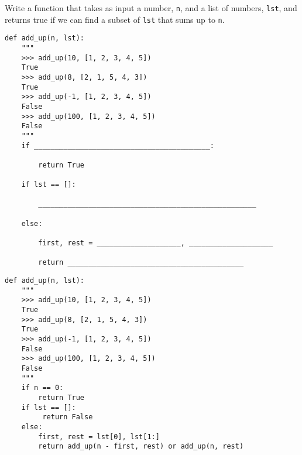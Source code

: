 \begin{blocksection}
\question Write a function that takes as input a number, \texttt{n}, and a list of numbers, \texttt{lst}, and returns true if we can find a subset of \texttt{lst} that sums up to \texttt{n}.

\ifprintanswers\else
\begin{lstlisting}
def add_up(n, lst):
    """ 
    >>> add_up(10, [1, 2, 3, 4, 5])
    True
    >>> add_up(8, [2, 1, 5, 4, 3])
    True
    >>> add_up(-1, [1, 2, 3, 4, 5])
    False
    >>> add_up(100, [1, 2, 3, 4, 5])
    False
    """
    if __________________________________________:
    
        return True
        
    if lst == []:
    
        ____________________________________________________
        
    else:
    
        first, rest = ____________________, ____________________
        
        return __________________________________________
\end{lstlisting}
\fi

\begin{solution}
\begin{lstlisting}
def add_up(n, lst):
    """ 
    >>> add_up(10, [1, 2, 3, 4, 5])
    True
    >>> add_up(8, [2, 1, 5, 4, 3])
    True
    >>> add_up(-1, [1, 2, 3, 4, 5])
    False
    >>> add_up(100, [1, 2, 3, 4, 5])
    False
    """
    if n == 0:
        return True
    if lst == []:
         return False  
    else:
        first, rest = lst[0], lst[1:]
        return add_up(n - first, rest) or add_up(n, rest)

\end{lstlisting}
\end{solution}
\end{blocksection}
